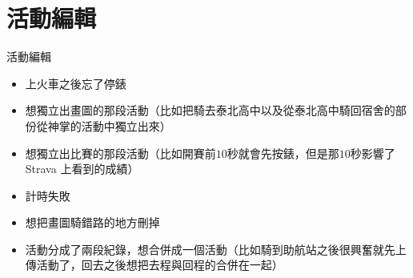 \section{活動編輯}

\begin{frame}{活動編輯}
\begin{itemize}
\item 上火車之後忘了停錶
\item 想獨立出畫圖的那段活動（比如把騎去泰北高中以及從泰北高中騎回宿舍的部份從神掌的活動中獨立出來）
\item 想獨立出比賽的那段活動（比如開賽前$10$秒就會先按錶，但是那$10$秒影響了 Strava 上看到的成績）
\item 計時失敗
\item 想把畫圖騎錯路的地方刪掉
\item 活動分成了兩段紀錄，想合併成一個活動（比如騎到助航站之後很興奮就先上傳活動了，回去之後想把去程與回程的合併在一起）
\end{itemize}
\end{frame}

